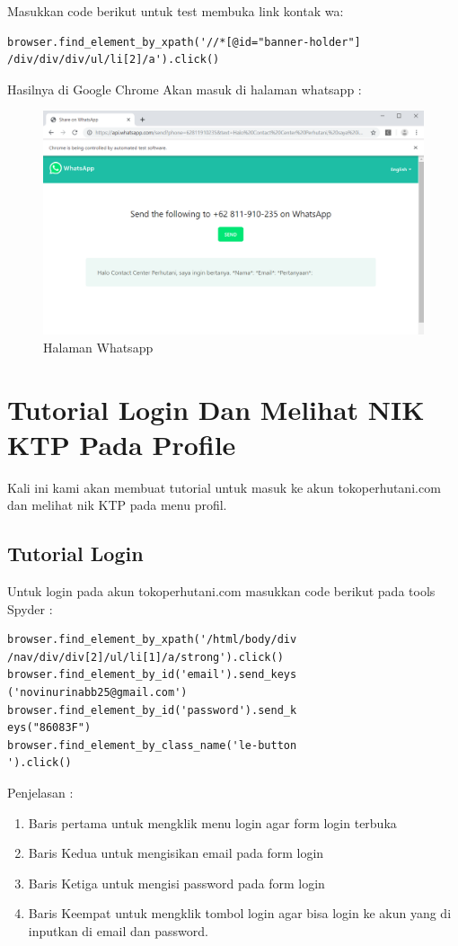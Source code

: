 Masukkan code berikut untuk test membuka link kontak wa:

\begin{verbatim}
browser.find_element_by_xpath('//*[@id="banner-holder"]
/div/div/div/ul/li[2]/a').click()
\end{verbatim}

Hasilnya  di Google Chrome Akan masuk di halaman whatsapp : 

\begin{figure}[h]
	\centering
	\includegraphics[scale=0.25]{figures/5linkwa}
	\caption{Halaman Whatsapp}
\end{figure}

\newpage
\section{Tutorial Login Dan Melihat NIK KTP Pada Profile}
Kali ini kami akan membuat tutorial untuk masuk ke akun tokoperhutani.com dan melihat nik KTP pada menu profil.  
\subsection{Tutorial Login}
Untuk login pada akun tokoperhutani.com masukkan code berikut pada tools Spyder :
\begin{verbatim}
browser.find_element_by_xpath('/html/body/div
/nav/div/div[2]/ul/li[1]/a/strong').click()
browser.find_element_by_id('email').send_keys
('novinurinabb25@gmail.com')
browser.find_element_by_id('password').send_k
eys("86083F")
browser.find_element_by_class_name('le-button
').click()
\end{verbatim}

Penjelasan :
\begin{enumerate}
	\item Baris pertama untuk mengklik menu login agar form login terbuka
	\item Baris Kedua untuk mengisikan email pada form login 
	\item Baris Ketiga untuk mengisi password pada form login
	\item Baris Keempat untuk mengklik tombol login agar bisa login ke akun yang di inputkan di email dan password.
\end{enumerate}

